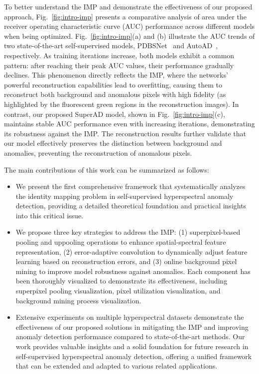 To better understand the IMP and demonstrate the effectiveness of our proposed approach, Fig.~\ref{fig:intro-imp} presents a comparative analysis of area under the receiver operating characteristic curve (AUC) performance across different models when being optimized. Fig.~\ref{fig:intro-imp}(a) and (b) illustrate the AUC trends of two state-of-the-art self-supervised models, PDBSNet~\cite{PDBSNet} and AutoAD~\cite{AutoAD}, respectively. As training iterations increase, both models exhibit a common pattern: after reaching their peak AUC values, their performance gradually declines. This phenomenon directly reflects the IMP, where the networks' powerful reconstruction capabilities lead to overfitting, causing them to reconstruct both background and anomalous pixels with high fidelity (as highlighted by the fluorescent green regions in the reconstruction images). In contrast, our proposed SuperAD model, shown in Fig.~\ref{fig:intro-imp}(c), maintains stable AUC performance even with increasing iterations, demonstrating its robustness against the IMP. The reconstruction results further validate that our model effectively preserves the distinction between background and anomalies, preventing the reconstruction of anomalous pixels.


The main contributions of this work can be summarized as follows:

\begin{itemize}
    \item We present the first comprehensive framework that systematically analyzes the identity mapping problem in self-supervised hyperspectral anomaly detection, providing a detailed theoretical foundation and practical insights into this critical issue.

    \item We propose three key strategies to address the IMP: (1) superpixel-based pooling and uppooling operations to enhance spatial-spectral feature representation, (2) error-adaptive convolution to dynamically adjust feature learning based on reconstruction errors, and (3) online background pixel mining to improve model robustness against anomalies. Each component has been thoroughly visualized to demonstrate its effectiveness, including superpixel pooling visualization, pixel utilization visualization, and background mining process visualization.

    \item Extensive experiments on multiple hyperspectral datasets demonstrate the effectiveness of our proposed solutions in mitigating the IMP and improving anomaly detection performance compared to state-of-the-art methods. Our work provides valuable insights and a solid foundation for future research in self-supervised hyperspectral anomaly detection, offering a unified framework that can be extended and adapted to various related applications.
\end{itemize}
